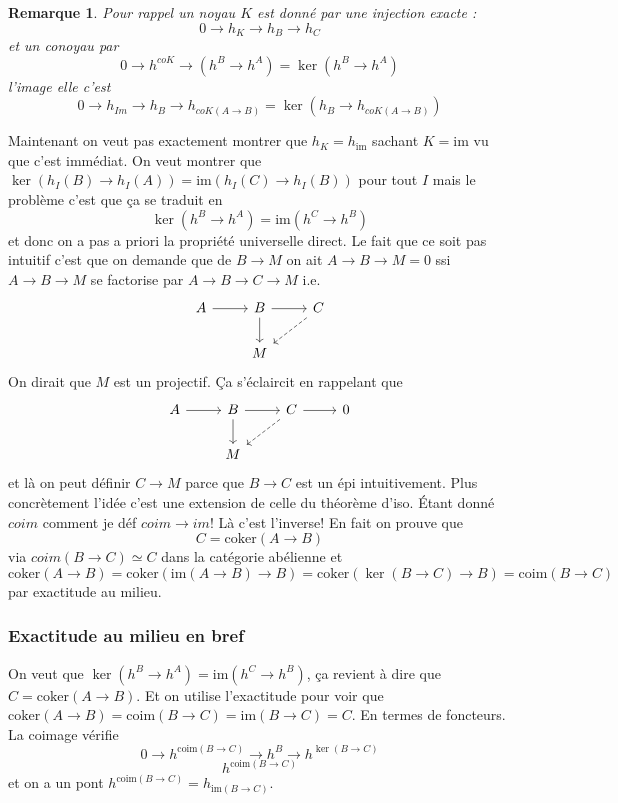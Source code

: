 \documentclass[a4paper,12pt]{book}
\newcommand{\im}{\textrm{im}}
\newcommand{\coker}{\textrm{coker}}
\newcommand{\coim}{\textrm{coim}}
\theoremstyle{plain}
\newtheorem{rem}{Remarque}
\theoremstyle{definition}
\theoremstyle{remark}
\begin{document}
\begin{rem}
Pour rappel un noyau $K$ est donné par une
injection exacte :
\[0\to h_K\to h_B\to h_C\]
et un conoyau par
\[0\to h^{coK}\to (h^B\to h^A)=\ker(h^B\to h^A)\]
l'image elle c'est
\[0\to h_{Im}\to h_{B}\to h_{coK(A\to B)}=\ker(h_B\to h_{coK(A\to B)})\]
\end{rem}
Maintenant on veut pas exactement montrer que $h_K=h_{\im}$
sachant $K=\im$ vu que c'est immédiat. On veut montrer
que $\ker(h_I(B)\to h_I(A))=\im(h_I(C)\to h_I(B))$ pour tout $I$
mais le problème c'est que ça se traduit en
\[\ker(h^B\to h^A)=\im(h^C\to h^B)\]
et donc on a pas a priori la propriété universelle direct. Le fait
que ce soit pas intuitif c'est que on demande que de $B\to M$
on ait 
$A\to B\to M=0$ ssi $A\to B\to M$ se factorise par $A\to B\to C\to
M$ i.e.
\[\begin{tikzcd}
  A & B & C \\
	& M
	\arrow[from=1-1, to=1-2]
	\arrow[from=1-2, to=1-3]
	\arrow[from=1-2, to=2-2]
	\arrow[dashed, from=1-3, to=2-2]
\end{tikzcd}\]
On dirait que $M$ est un projectif. Ça s'éclaircit en rappelant que
\[\begin{tikzcd}
  A & B & C &0\\
   & M & 
	\arrow[from=1-1, to=1-2]
	\arrow[from=1-2, to=1-3]
	\arrow[from=1-3, to=1-4]
	\arrow[from=1-2, to=2-2]
	\arrow[dashed, from=1-3, to=2-2]
\end{tikzcd}\]
et là on peut définir $C\to M$ parce que $B\to C$ est un épi 
intuitivement. Plus concrètement l'idée c'est une extension de
celle du théorème d'iso.
Étant donné $coim$ comment je déf $coim\to im$! Là c'est l'inverse!
En fait on prouve que \[C=\coker(A\to B)\] via
$coim(B\to C)\simeq C$ dans la catégorie abélienne et
\[\coker(A\to B)=\coker(\im(A\to B)\to B)=\coker(\ker(B\to C)\to B)=\coim(B\to C)\] par exactitude au milieu. 


\subsubsection{Exactitude au milieu en bref}
On veut que $\ker(h^B\to h^A)=\im(h^C\to h^B)$, ça revient à dire
que $C=\coker(A\to B)$. Et on utilise l'exactitude pour voir que
$\coker(A\to B)=\coim(B\to C)=\im(B\to C)=C$. En termes de 
foncteurs. La coimage vérifie 
\[0\to h^{\coim(B\to C)}\to h^B\to h^{\ker(B\to C)}\]
\[h^{\coim(B\to C)}\]
et on a un pont $h^{\coim(B\to C)}=h_{\im(B\to C)}$.
\end{document}
